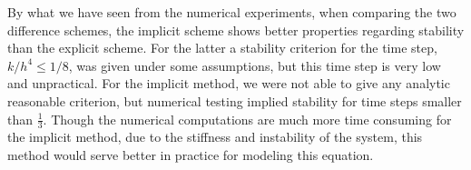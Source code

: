 By what we have seen from the numerical experiments, when comparing the two difference schemes, the implicit scheme shows better properties regarding stability than the explicit scheme. For the latter a stability criterion for the time step, $k/h^4 \le 1/8$, was given under some assumptions, but this time step is very low and unpractical. For the implicit method, we were not able to give any analytic reasonable criterion, but numerical testing implied stability for time steps smaller than $\frac{1}{3}$. Though the numerical computations are much more time consuming for the implicit method, due to the stiffness and instability of the system, this method would serve better in practice for modeling this equation.
